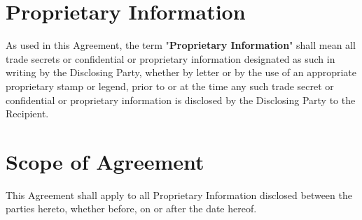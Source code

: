 \documentclass[12pt]{article}
\begin{document}
\section{Proprietary Information}
As used in this Agreement, the term "{\bf Proprietary Information}" shall mean all trade secrets or confidential or proprietary information designated as such in writing by the Disclosing Party, whether by letter or by the use of an appropriate proprietary stamp or legend, prior to or at the time any such trade secret or confidential or proprietary information is disclosed by the Disclosing Party to the Recipient.

\section{Scope of Agreement}
This Agreement shall apply to all Proprietary Information disclosed between the parties hereto, whether before, on or after the date hereof.
\end{document}
